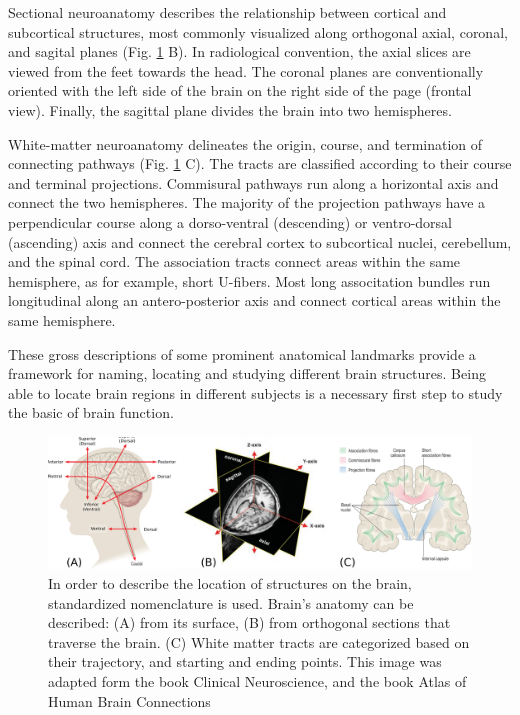 Sectional neuroanatomy describes the relationship between cortical and
subcortical structures, most commonly visualized along orthogonal axial,
coronal, and sagital planes (Fig. \ref{fig:anatomy_terminology} B). In radiological
convention, the axial slices are viewed from the feet towards the head.
The coronal planes are conventionally oriented with the left side of the brain
on the right side of the page (frontal view). Finally, the sagittal plane 
divides the brain into two hemispheres.

White-matter neuroanatomy delineates the origin, course, and termination of
connecting pathways (Fig. \ref{fig:anatomy_terminology} C). The tracts are classified
according to their course and terminal projections. Commisural pathways run
along a horizontal axis and connect the two hemispheres. The majority of the
projection pathways have a perpendicular course along a dorso-ventral
(descending) or ventro-dorsal (ascending) axis and connect the cerebral
cortex to subcortical nuclei, cerebellum, and the spinal cord. The association
tracts connect areas within the same hemisphere, as for example, short U-fibers.
Most long associtation bundles
run longitudinal along an antero-posterior axis and connect cortical 
areas within the same hemisphere.

These gross descriptions of some prominent anatomical landmarks provide a
framework for naming, locating and studying different brain structures. Being
able to locate brain regions in different subjects is a necessary first step
to study the basic of brain function.

\begin{figure}[t]
    \includegraphics[width=\textwidth]{2.neuroanatomy/img/terminology.png}
    \caption{In order to describe the location of structures on the brain, standardized
             nomenclature is used. Brain's anatomy can be described: (A) from its surface,
             (B) from orthogonal sections that traverse the brain. (C) White matter tracts
             are categorized based on their trajectory, and starting and ending points.
             This image was adapted form the book Clinical Neuroscience\cite{Johns},
             and the book Atlas of Human Brain Connections\cite{Catani2012}}
    \label{fig:anatomy_terminology}
\end{figure}

